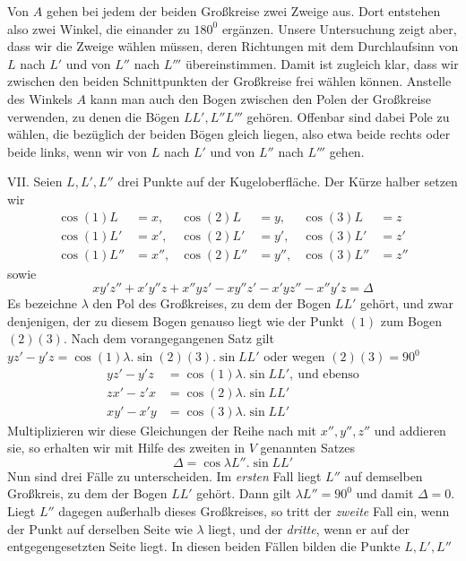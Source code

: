%
\noindent Von \(A\) gehen bei jedem der beiden Großkreise zwei Zweige aus. Dort entstehen also zwei Winkel, die einander zu \(180^0\) ergänzen. Unsere Untersuchung zeigt aber, dass wir die Zweige wählen müssen, deren Richtungen mit dem Durchlaufsinn von \(L\) nach \(L'\) und von \(L''\) nach \(L'''\) übereinstimmen. Damit ist zugleich klar, dass wir zwischen den beiden Schnittpunkten der Großkreise frei wählen können. Anstelle des Winkels \(A\) kann man auch den Bogen zwischen den Polen der Großkreise verwenden, zu denen die Bögen \(LL',L''L'''\) gehören. Offenbar sind dabei Pole zu wählen, die bezüglich der beiden Bögen gleich liegen, also etwa beide rechts oder beide links, wenn wir von \(L\) nach \(L'\) und von \(L''\) nach \(L'''\) gehen.

VII. Seien \(L,L',L''\) drei Punkte auf der Kugeloberfläche. Der Kürze halber setzen wir
\[
\begin{aligned}
\cos(1)L&=x,&\cos(2)L&=y,&\cos(3)L&=z\\
\cos(1)L'&=x',&\cos(2)L'&=y',&\cos(3)L'&=z'\\
\cos(1)L''&=x'',&\cos(2)L''&=y'',&\cos(3)L''&=z''
\end{aligned}
\]
\noindent sowie
\[
xy'z''+x'y''z+x''yz'-xy''z'-x'yz''-x''y'z=\Delta
\]
\noindent Es bezeichne \(\lambda\) den Pol des Großkreises, zu dem der Bogen \(LL'\) gehört, und zwar denjenigen, der zu diesem Bogen genauso liegt wie der Punkt \((1)\) zum Bogen \((2)(3)\). Nach dem vorangegangenen Satz gilt \(yz'-y'z=\cos(1)\lambda\mathord{.}\sin(2)(3)\mathord{.}\sin LL'\) oder wegen \((2)(3)=90^0\)
\[
\begin{aligned}
yz'-y'z&=\cos(1)\lambda\mathord{.}\sin LL',\ \text{und ebenso}\\
zx'-z'x&=\cos(2)\lambda\mathord{.}\sin LL'\\
xy'-x'y&=\cos(3)\lambda\mathord{.}\sin LL'
\end{aligned}
\]
\noindent Multiplizieren wir diese Gleichungen der Reihe nach mit \(x'',y'',z''\) und addieren sie, so erhalten wir mit Hilfe des zweiten in \(V\) genannten Satzes
\[
\Delta=\cos\lambda L''\mathord{.}\sin LL'
\]
\noindent Nun sind drei Fälle zu unterscheiden. Im \textit{ersten} Fall liegt \(L''\) auf demselben Großkreis, zu dem der Bogen \(LL'\) gehört. Dann gilt \(\lambda L''=90^0\) und damit \(\Delta=0\). Liegt \(L''\) dagegen außerhalb dieses Großkreises, so tritt der \textit{zweite} Fall ein, wenn der Punkt auf derselben Seite wie \(\lambda\) liegt, und der \textit{dritte}, wenn er auf der entgegengesetzten Seite liegt. In diesen beiden Fällen bilden die Punkte \(L,L',L''\)
